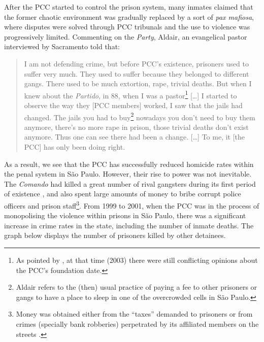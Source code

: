 After the PCC started to control the prison system, many inmates claimed that the former chaotic environment was gradually replaced by a sort of \textit{pax mafiosa}, where disputes were solved through PCC tribunals and the use to violence was progressively limited. Commenting on the \textit{Party}, Aldair, an evangelical pastor interviewed by Sacramento \citep[apud][71]{biondi2010junto} told that:

\begin{quotation}
I am not defending crime, but before PCC's existence, prisoners used to suffer very much. They used to suffer because they belonged to different gangs. There used to be much extortion, rape, trivial deaths. But when I knew about the \textit{Partido}, in 88, when I was a pastor\footnote{As pointed by \citet[71]{biondi2010junto}, at that time (2003) there were still conflicting opinions about the PCC's foundation date.} [\dots] I started to observe the way they [PCC members] worked, I saw that the jails had changed. The jails you had to buy\footnote{Aldair refers to the (then) usual practice of paying a fee to other prisoners or gangs to have a place to sleep in one of the overcrowded cells in S\~{a}o Paulo.} nowadays you don't need to buy them anymore, there's no more rape in prison, those trivial deaths don't exist anymore. Thus one can see there had been a change. [\dots] To me, it [the PCC] has only been doing right.
\end{quotation}

As a result, we see that the PCC has successfully reduced homicide rates within the penal system in S\~{a}o Paulo. However, their rise to power was not inevitable. The \textit{Comando} had killed a great number of rival gangsters during its first period of existence \citep[]{passos2013defesa}, and also spent large amounts of money to bribe corrupt police officers and prison staff\footnote{Money was obtained either from the ``taxes'' demanded to prisoners or from crimes (specially bank robberies) perpetrated by its affiliated members on the streets \citep[]{mingardi2007trabalho}.}. From 1999 to 2001, when the PCC was in the process of monopolising the violence within prisons in S\~{a}o Paulo, there was a significant increase in crime rates in the state, including the number of inmate deaths. The graph below displays the number of prisoners killed by other detainees.


